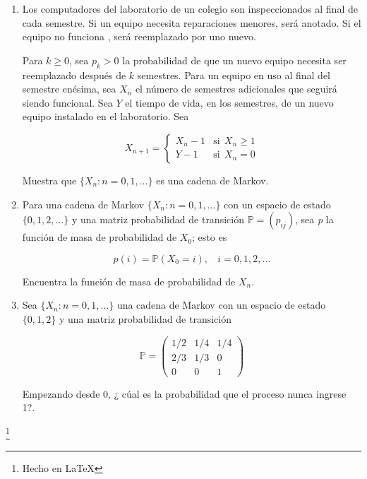 \documentclass[a4paper,11pt]{report}
\begin{document}
\begin{enumerate}
\item  Los computadores  del laboratorio de  un colegio son inspeccionados al final de cada semestre. Si un equipo necesita reparaciones menores, ser\'a anotado. Si el equipo no funciona , ser\'a reemplazado por uno nuevo. 

Para $k \geq  0$, sea $p_k > 0$ la probabilidad de que un nuevo equipo necesita ser reemplazado despu\'es de $k$ semestres. Para un equipo en uso al final del semestre en\'esima, sea $X_n$ el n\'umero de semestres adicionales que seguir\'a  siendo funcional. Sea $Y$ el tiempo de vida, en los semestres, de un nuevo equipo instalado en el laboratorio. Sea

\[
X_{n + 1} = \begin{cases}
X_n - 1 & \text{si}\ \  X_n \geq 1 \\
Y -1 & \text{si}\ \ X_n = 0
\end{cases}
\]

Muestra que $\{X_n: n = 0, 1, \dots  \}$ es una cadena de Markov.

\item Para una cadena de Markov $\{X_n:n =0, 1, \dots \}$ con un espacio de estado $\{0,1, 2, \dots \}$ y una matriz  probabilidad de transici\'on $\mathbb{P} = (p_{ij})$, sea \textit{p} la funci\'on de masa de probabilidad de $X_0$; esto es

\[
p(i) = \mathbb{P}(X_0 = i), \ \ \ \ i = 0, 1, 2, \dots
\]

Encuentra la funci\'on de masa de probabilidad de $X_n$.

\item Sea $\{X_n:n =0, 1, \dots \}$ una cadena de Markov con un espacio de estado $\{0, 1, 2\}$ y una matriz probabilidad de transici\'on

\[
\mathbb{P}= \begin{pmatrix}
1/2 & 1/4 & 1/4 \\ 
2/3 & 1/3 & 0 \\ 
0   &   0 & 1
\end{pmatrix}
\]

Empezando desde $0$, ¿ c\'ual es la probabilidad que el proceso nunca ingrese 1?.
\end{enumerate}
\begin{flushright}
\footnote{Hecho en \LaTeX}
\end{flushright}
\end{document}
